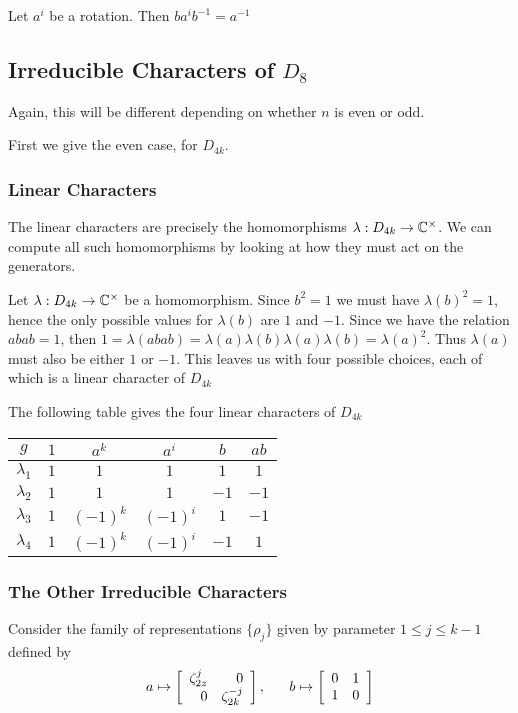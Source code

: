 Let $a^i$ be a rotation. Then $ba^ib^{-1} = a^{-1}$



\subsection{Irreducible Characters of $D_8$}

Again, this will be different depending on whether $n$ is even or odd. 

First we give the even case, for $D_{4k}$.

\subsubsection{Linear Characters}
The linear characters are precisely the homomorphisms $\lambda : D_{4k} \rightarrow \mathbb{C}^\times$. We can compute all 
such homomorphisms by looking at how they must act on the generators. 

Let $\lambda : D_{4k} \rightarrow \mathbb{C}^\times$ be a homomorphism. Since $b^2 = 1$ we must have $\lambda(b)^2 = 1$, 
hence the only possible values for $\lambda(b)$ are $1$ and $-1$. Since we have the relation $abab = 1$, then $1 = 
\lambda(abab) = \lambda(a)\lambda(b)\lambda(a)\lambda(b) = \lambda(a)^2$. Thus $\lambda(a)$ must also be either $1$ 
or $-1$. This leaves us with four possible choices, each of which is a linear character of $D_{4k}$

The following table gives the four linear characters of $D_{4k}$
\begin{center}
\begin{tabular}{c|ccccc}
    $g$ &$1$ & $a^k$ & $a^i$ & $b$ & $ab$ \\ \hline
    $\lambda_1$ & $1$ & $1$ & $1$ & $1$ & $1$ \\
    $\lambda_2$ & $1$ & $1$ & $1$ & $-1$ & $-1$ \\
    $\lambda_3$ & $1$ & $(-1)^k$ & $(-1)^i$ & $1$ & $-1$ \\
    $\lambda_4$ & $1$ & $(-1)^k$ & $(-1)^i$ & $-1$ & $1$ \\
\end{tabular}
\end{center}

\subsubsection{The Other Irreducible Characters}
Consider the family of representations $\{\rho_j\}$ given by parameter $1 \leq j \leq k-1$ defined by
\[
    a \mapsto \left[\begin{array}{rr}\zeta_{2z}^j&0\\0&\zeta_{2k}^{-j}\end{array}\right], \quad \ \ b \mapsto \left[\begin{array}{rr}0&1\\1&0\end{array}\right]
\]

